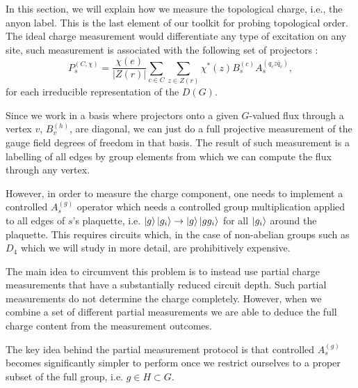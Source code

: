 \documentclass[two column]{article}
\newcommand{\caro}[1]{\textcolor{red}{[#1]}}
\begin{document}
In this section, we will explain how we measure the topological charge, i.e., the anyon label. This is the last element of our toolkit for probing topological order. The ideal charge measurement would differentiate any type of excitation on any site, such measurement is associated with the following set of projectors \cite{}:
\begin{equation}
    P_s^{(C, \chi)} = \frac{\chi(e)}{|Z(r)|}\sum_{c \in C}\sum_{z \in Z(r)}\chi^*(z)B_s^{(c)}A_s^{(q_c z \bar{q}_c)},
\end{equation}
for each irreducible representation of the $D(G)$.

Since we work in a basis where projectors onto a given $G$-valued flux through a vertex $v$, $B_v^{(h)}$, are diagonal, we can just do a full projective measurement of the gauge field degrees of freedom in that basis. 
The result of such measurement is a labelling of all edges by group elements from which we can compute the flux through any vertex. 

However, in order to measure the charge component, one needs to implement a controlled $A^{(g)}_s$ operator which needs a controlled group multiplication applied to all edges of $s$'s plaquette, i.e. $\ket{g}\ket{g_i} \rightarrow \ket{g}\ket{gg_i}$ for all $\ket{g_i}$ around the plaquette.
This requires circuits which, in the case of non-abelian groups such as $D_4$ which we will study in more detail, are prohibitively expensive. 

The main idea to circumvent this problem is to instead use partial charge measurements that have a substantially reduced circuit depth. Such partial measurements do not determine the charge completely. However, when we combine a set of different partial measurements we are able to deduce the full charge content from the measurement outcomes.



The key idea behind the partial measurement protocol is that controlled $A_s^{(g)}$ becomes significantly simpler to perform once we restrict ourselves to a proper subset of the full group, i.e. $g \in H \subset G$.
\end{document}
